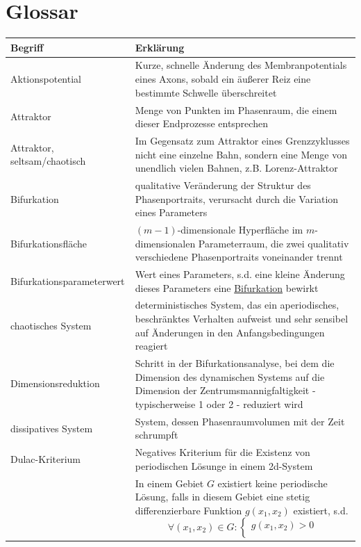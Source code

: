 \documentclass{article}
\begin{document}
\section{Glossar}
\begin{xltabular}{\linewidth}{p{6cm}|X}
	\hline\hline
		Begriff & Erklärung \\
	\hline
		Aktionspotential & Kurze, schnelle Änderung des Membranpotentials eines Axons, sobald ein äußerer Reiz eine bestimmte Schwelle überschreitet \\
	\hline
		Attraktor & Menge von Punkten im Phasenraum,
die einem dieser Endprozesse entsprechen \\
	\hline
		Attraktor, seltsam/chaotisch & Im Gegensatz zum Attraktor eines Grenzzyklusses nicht eine einzelne Bahn, sondern eine Menge von unendlich vielen Bahnen, z.B. Lorenz-Attraktor \\
	\hline
		Bifurkation & qualitative Veränderung der Struktur des Phasenportraits, verursacht durch die Variation eines Parameters \\
	\hline
		Bifurkationsfläche & $(m-1)$-dimensionale Hyperfläche im $m$-dimensionalen Parameterraum, die zwei qualitativ verschiedene Phasenportraits voneinander trennt \\
	\hline
		Bifurkationsparameterwert & Wert eines Parameters, s.d. eine kleine Änderung dieses Parameters eine \underline{Bifurkation} bewirkt \\
	\hline
		chaotisches System & deterministisches System, das ein aperiodisches, beschränktes Verhalten aufweist und sehr sensibel auf Änderungen in den Anfangsbedingungen reagiert \\
	\hline
		Dimensionsreduktion & Schritt in der Bifurkationsanalyse, bei dem die Dimension des dynamischen Systems auf die Dimension der Zentrumsmannigfaltigkeit - typischerweise 1 oder 2 - reduziert wird \\
	\hline
		dissipatives System & System, dessen Phasenraumvolumen mit der Zeit schrumpft \\
	\hline
		Dulac-Kriterium & Negatives Kriterium für die Existenz von periodischen Lösunge in einem 2d-System\\
		& {\color{gruen}
				In einem Gebiet $G$ existiert keine periodische Lösung, falls in diesem Gebiet eine stetig differenzierbare Funktion $g(x_1, x_2)$ existiert, s.d.
				\begin{equation}
					\forall (x_1, x_2) \in G :
					\begin{cases}
						g(x_1, x_2) > 0 \\

\end{cases}
\end{equation}}
\end{xltabular}
\end{document}

